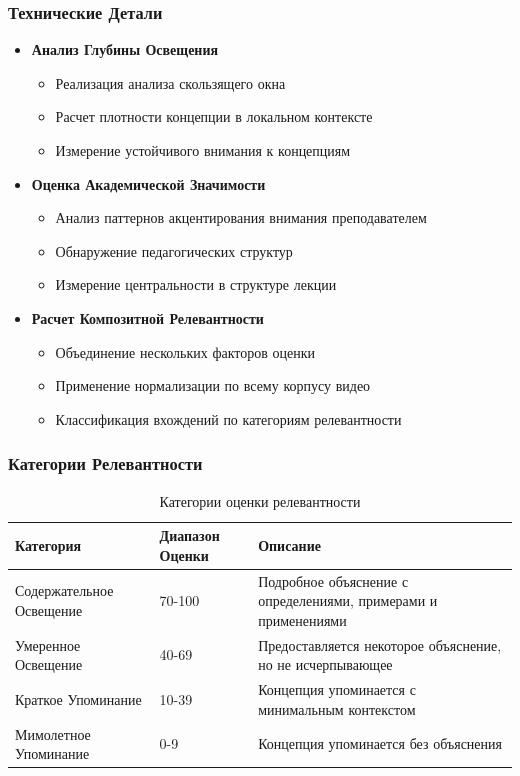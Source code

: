 \documentclass[12pt,a4paper]{article}
\begin{document}
\subsubsection{Технические Детали}
\begin{itemize}
    \item \textbf{Анализ Глубины Освещения}
    \begin{itemize}
        \item Реализация анализа скользящего окна
        \item Расчет плотности концепции в локальном контексте
        \item Измерение устойчивого внимания к концепциям
    \end{itemize}

    \item \textbf{Оценка Академической Значимости}
    \begin{itemize}
        \item Анализ паттернов акцентирования внимания преподавателем
        \item Обнаружение педагогических структур
        \item Измерение центральности в структуре лекции
    \end{itemize}

    \item \textbf{Расчет Композитной Релевантности}
    \begin{itemize}
        \item Объединение нескольких факторов оценки
        \item Применение нормализации по всему корпусу видео
        \item Классификация вхождений по категориям релевантности
    \end{itemize}
\end{itemize}

\subsubsection{Категории Релевантности}

\begin{table}[h]
\centering
\begin{tabular}{@{}llp{8cm}@{}}
\toprule
\textbf{Категория} & \textbf{Диапазон Оценки} & \textbf{Описание} \\
\midrule
Содержательное Освещение & 70-100 & Подробное объяснение с определениями, примерами и применениями \\
Умеренное Освещение & 40-69 & Предоставляется некоторое объяснение, но не исчерпывающее \\
Краткое Упоминание & 10-39 & Концепция упоминается с минимальным контекстом \\
Мимолетное Упоминание & 0-9 & Концепция упоминается без объяснения \\
\bottomrule
\end{tabular}
\caption{Категории оценки релевантности}
\end{table}
\end{document}
